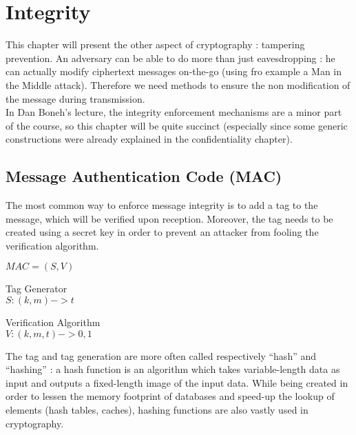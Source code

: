 \chapter{Integrity}


This chapter will present the other aspect of cryptography : tampering prevention. An adversary can be able to do more than just eavesdropping : he can actually modify ciphertext messages on-the-go (using fro example a Man in the Middle attack). Therefore we need methods to ensure the non modification of the message during transmission.\\
In Dan Boneh's lecture, the integrity enforcement mechanisms are a minor part of the course, so this chapter will be quite succinct (especially since some generic constructions were already explained in the confidentiality chapter).


\section{Message Authentication Code (MAC)}

The most common way to enforce message integrity is to add a tag to the message, which will be verified upon reception. Moreover, the tag needs to be created using a secret key in order to prevent an attacker from fooling the verification algorithm.

\begin{mydef} $MAC = (S,V)$  
\begin{flushright}
	\begin{minipage}[t]{0.45\textwidth}
		\indent		 \textnormal{Tag Generator} \\
		\indent      $S: (k,m) -> t$   \\
	\end{minipage}
	\begin{minipage}[t]{0.45\textwidth}
		\indent	\textnormal{Verification Algorithm } \\
		\indent    $V: (k,m,t) -> {0,1}$ \\
	\end{minipage}
\end{flushright}
\end{mydef}

The tag and tag generation are more often called respectively ``hash'' and ``hashing''  : a hash function is an algorithm which takes variable-length data as input and outputs a fixed-length image of the input data. While being created in order to lessen the memory footprint of databases and speed-up the lookup of elements (hash tables, caches), hashing functions are also vastly used in cryptography. 
 
